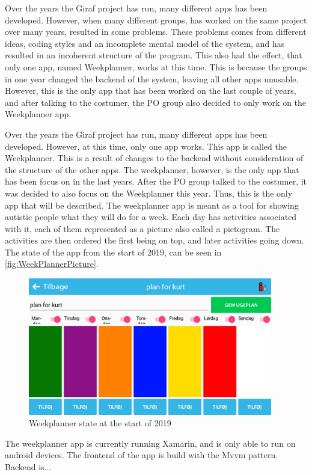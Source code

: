 Over the years the Giraf project has run, many different apps has been developed. However, when many different groups, has worked on the same project over many years,  resulted in some problems. \newline
These problems comes from different ideas, coding styles and an incomplete mental model of the system, and has resulted in an incoherent structure of the program.  \newline
This also had the effect, that only one app, named Weekplanner, works at this time. This is because the groups in one year changed the backend of the system, leaving all other apps unusable. \newline
However, this is the only app that has been worked on the last couple of years, and after talking to the costumer, the \gls{PO} group also decided to only work on the Weekplanner app.  \newline 

\par \noindent
Over the years the Giraf project has run, many different apps has been developed. However, at this time, only one app works. This app is called the Weekplanner. This is a result of changes to the backend without consideration of the structure of the other apps\cite{AppsStatus2019}.  \newline
The weekplanner, however, is the only app that has been focus on in the last years. After the \gls{PO} group talked to the costumer, it was decided to also focus on the Weekplanner this year. Thus, this is the only app that will be described.  \newline
The weekplanner app is meant as a tool for showing autistic people what they will do for a week. Each day has activities associated with it, each of them represented as a picture also called a pictogram. The activities are then ordered the first being on top, and later activities going down. The state of the app from the start of 2019, can be seen in \autoref{fig:WeekPlannerPicture}.

\begin{figure}[ht]
        \begin{center}
            \includegraphics[width=0.95\textwidth]{figures/WeekPlannerPicture}
        \end{center}
        \caption{Weekplanner state at the start of 2019}
        \label{fig:WeekPlannerPicture}
\end{figure}

\noindent
The weekplanner app is currently running Xamarin, and is only able to run on android devices. The frontend of the app is build with the \gls{Mvvm} pattern. 
Backend is... %

